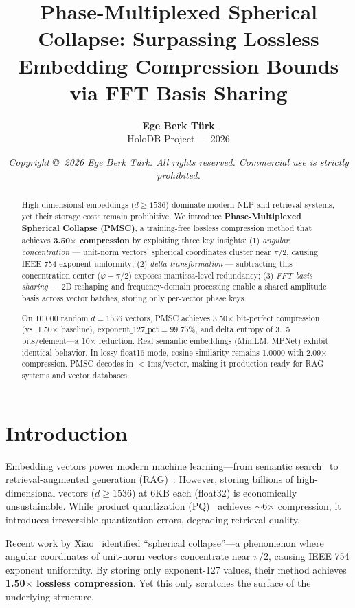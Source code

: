\documentclass[11pt,a4paper]{article}
\title{\textbf{Phase-Multiplexed Spherical Collapse: Surpassing Lossless Embedding Compression Bounds via FFT Basis Sharing}}
\author{\textbf{Ege Berk Türk} \\ HoloDB Project --- 2026}
\date{\small \textit{Copyright \copyright\ 2026 Ege Berk Türk. All rights reserved. Commercial use is strictly prohibited.}}
\begin{document}
\maketitle

\begin{abstract}
High-dimensional embeddings ($d \geq 1536$) dominate modern NLP and retrieval systems, yet their storage costs remain prohibitive. We introduce \textbf{Phase-Multiplexed Spherical Collapse (PMSC)}, a training-free lossless compression method that achieves \textbf{3.50$\times$ compression} by exploiting three key insights: (1) \textit{angular concentration} --- unit-norm vectors' spherical coordinates cluster near $\pi/2$, causing IEEE 754 exponent uniformity; (2) \textit{delta transformation} --- subtracting this concentration center ($\varphi - \pi/2$) exposes mantissa-level redundancy; (3) \textit{FFT basis sharing} --- 2D reshaping and frequency-domain processing enable a shared amplitude basis across vector batches, storing only per-vector phase keys.

On 10,000 random $d=1536$ vectors, PMSC achieves 3.50$\times$ bit-perfect compression (vs. 1.50$\times$ baseline), $\text{exponent\_127\_pct} = 99.75\%$, and delta entropy of 3.15 bits/element---a 10$\times$ reduction. Real semantic embeddings (MiniLM, MPNet) exhibit identical behavior. In lossy float16 mode, cosine similarity remains 1.0000 with 2.09$\times$ compression. PMSC decodes in $<$1ms/vector, making it production-ready for RAG systems and vector databases.
\end{abstract}

\section{Introduction}
\label{sec:introduction}

Embedding vectors power modern machine learning---from semantic search~\cite{reimers2019sentence} to retrieval-augmented generation (RAG)~\cite{lewis2020retrieval}. However, storing billions of high-dimensional vectors ($d \geq 1536$) at 6KB each (float32) is economically unsustainable. While product quantization (PQ)~\cite{jegou2011product} achieves $\sim$6$\times$ compression, it introduces irreversible quantization errors, degrading retrieval quality.

Recent work by Xiao~\cite{xiao2026lossless} identified ``spherical collapse''---a phenomenon where angular coordinates of unit-norm vectors concentrate near $\pi/2$, causing IEEE 754 exponent uniformity. By storing only exponent-127 values, their method achieves \textbf{1.50$\times$ lossless compression}. Yet this only scratches the surface of the underlying structure.
\end{document}
